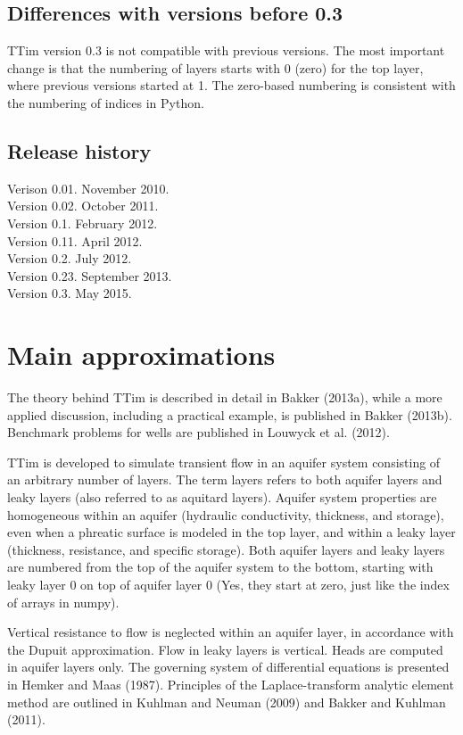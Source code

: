 \documentclass [10pt,letterpaper] {article}
\begin{document}
\subsection{Differences with versions before 0.3}
TTim version 0.3 is not compatible with previous versions. The most important change is that the numbering of layers starts with 0 (zero) for the top layer, where previous versions started at 1. The zero-based numbering is consistent with the numbering of indices in Python.

\subsection{Release history}
\noindent Verison 0.01. November 2010.
\\ Version 0.02. October 2011.
\\ Version 0.1. February 2012.
\\ Version 0.11. April 2012.
\\ Version 0.2. July 2012.
\\ Version 0.23. September 2013.
\\ Version 0.3. May 2015.

\section{Main approximations}
The theory behind TTim is described in detail in Bakker (2013a), while a more applied discussion, including a practical example, is published in Bakker (2013b). Benchmark problems for wells are published in Louwyck et al. (2012).

TTim is developed to simulate transient flow in an aquifer system consisting of an arbitrary number of layers.
The term layers refers to both aquifer layers and leaky layers
(also referred to as aquitard layers). Aquifer system properties
are homogeneous within an aquifer (hydraulic conductivity,
thickness, and storage), even when a phreatic surface is modeled in the top layer, and within a leaky layer
(thickness, resistance, and specific storage).
Both aquifer layers and leaky layers are numbered from the top of the aquifer system to
the bottom, starting with leaky layer 0 on top of aquifer layer 0 (Yes, they start at zero, just like the index of arrays in numpy).

Vertical resistance to flow is neglected within an aquifer layer, in accordance with the Dupuit approximation. Flow in leaky layers is vertical. Heads are computed in aquifer layers
only. The governing system of differential equations is presented in Hemker and Maas (1987). 
Principles of the Laplace-transform analytic element method are outlined
in Kuhlman and Neuman (2009) and Bakker and Kuhlman (2011).
\end{document}
